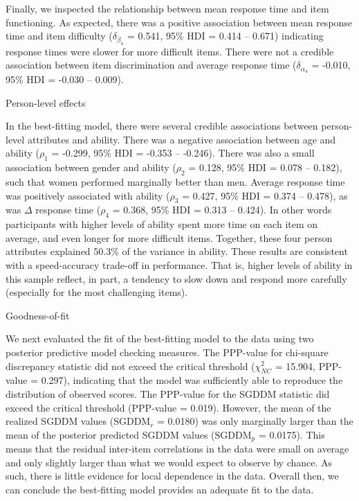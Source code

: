 \documentclass[a4paper,man,natbib,noextraspace]{apa6}
\makeatletter
\renewcommand{\subsubsection}{\@startsection{subsubsection}{3}
  {\z@}%
  {\b@level@two@skip}{\e@level@two@skip}%
  {\normalfont\normalsize\bfseries}}
\makeatother
\begin{document}
Finally, we inspected the relationship between mean response time and item functioning. As expected, there was a positive association between mean response time and item difficulty ($\delta_{\beta_4}$ = 0.541, 95\% HDI = 0.414 -- 0.671) indicating response times were slower for more difficult items. There were not a credible association between item discrimination and average response time ($\delta_{\alpha_4}$ = -0.010, 95\% HDI = -0.030 -- 0.009).

\subsubsection{Person-level effects}

In the best-fitting model, there were several credible associations between person-level attributes and ability. There was a negative association between age and ability ($\rho_1$ = -0.299, 95\% HDI = -0.353 -- -0.246). There was also a small association between gender and ability ($\rho_2$ = 0.128, 95\% HDI = 0.078 -- 0.182), such that women performed marginally better than men. Average response time was positively associated with ability ($\rho_3$ = 0.427, 95\% HDI = 0.374 -- 0.478), as was $\Delta$ response time ($\rho_4$ = 0.368, 95\% HDI = 0.313 -- 0.424). In other words participants with higher levels of ability spent more time on each item on average, and even longer for more difficult items. Together, these four person attributes explained 50.3\% of the variance in ability. These results are consistent with a speed-accuracy trade-off in performance. That is, higher levels of ability in this sample reflect, in part, a tendency to slow down and respond more carefully (especially for the most challenging items).  

\subsubsection{Goodness-of-fit}

We next evaluated the fit of the best-fitting model to the data using two posterior predictive model checking measures. The PPP-value for chi-square discrepancy statistic did not exceed the critical threshold ($\chi^2_{NC}$ = 15.904, PPP-value = 0.297), indicating that the model was sufficiently able to reproduce the distribution of observed scores. The PPP-value for the SGDDM statistic did exceed the critical threshold (PPP-value = 0.019). However, the mean of the realized SGDDM values ($\text{SGDDM}_r$ = 0.0180) was only marginally larger than the mean of the posterior predicted SGDDM values ($\text{SGDDM}_p$ = 0.0175). This means that the residual inter-item correlations in the data were small on average and only slightly larger than what we would expect to observe by chance. As such, there is little evidence for local dependence in the data. Overall then, we can conclude the best-fitting model provides an adequate fit to the data.
\end{document}
